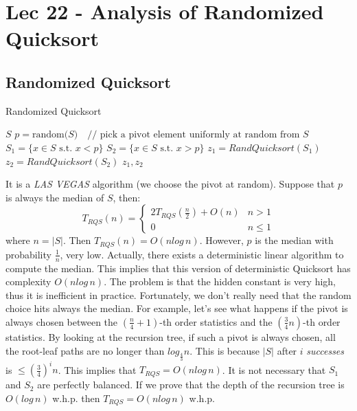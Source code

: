 \chapter{Lec 22 - Analysis of Randomized Quicksort}

\section{Randomized Quicksort}
\begin{algorithm}
\caption{Randomized Quicksort}\label{RQS}
    \begin{algorithmic}[1]
            \Return $S$
        \EndIf
        \State $p = \text{random($S$)}\quad \text{// pick a pivot element uniformly at random from $S$}$
        \State $S_1 = \{x \in S\,\, \text{s.t. }x < p\}$
        \State $S_2 = \{x \in S\,\, \text{s.t. } x > p\}$
        \State $z_1 = RandQuicksort(S_1)$
        \State $z_2 = RandQuicksort(S_2)$
        \State \Return $z_1, z_2$
    \EndProcedure   
    \end{algorithmic}
\end{algorithm}
It is a \textit{LAS VEGAS} algorithm (we choose the pivot at random).\newline\newline
Suppose that $p$ is always the median of $S$, then:
\[
    T_{RQS}(n) = 
    \begin{cases}
        2T_{RQS}(\frac{n}{2}) + O(n) & n > 1 \\
        0 & n\leq 1
    \end{cases}
\]
where $n = |S|$. Then $T_{RQS}(n) = O(nlog\,n)$.\newline\newline
However, $p$ is the median with probability $\frac{1}{n}$, very low. Actually, there exists a deterministic linear algorithm to compute the median. This implies that this version of deterministic Quicksort has complexity $O(nlog\,n)$. The problem is that the hidden constant is very high, thus it is inefficient in practice.\newline\newline
Fortunately, we don't really need that the random choice hits always the median. For example, let's see what happens if the pivot is always chosen between the $(\frac{n}{4} + 1)$-th order statistics and the $(\frac{3}{4}n)$-th order statistics. By looking at the recursion tree, if such a pivot is always chosen, all the root-leaf paths are no longer than $log_{\frac{4}{3}}n$. This is because $|S|$ after $i$ \textit{successes} is $\leq (\frac{3}{4})^in$. This implies that $T_{RQS} = O(nlog\,n)$. It is not necessary that $S_1$ and $S_2$ are perfectly balanced.\newline\newline
If we prove that the depth of the recursion tree is $O(log\,n)$ w.h.p. then $T_{RQS} = O(nlog\,n)$ w.h.p.

